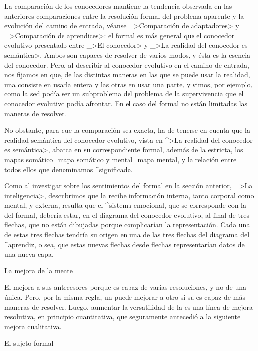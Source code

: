 La comparación de los conocedores mantiene la tendencia observada en las
anteriores comparaciones entre la resolución formal del problema
aparente y la evolución del camino de entrada, véanse _>Comparación de
adaptadores> y _>Comparación de aprendices>: el {\conocedor} formal es
más general que el conocedor evolutivo presentado entre _>El conocedor>
y _>La realidad del conocedor es semántica>. Ambos son capaces de
resolver de varios modos, y ésta es la esencia del conocedor. Pero, al
describir al conocedor evolutivo en el camino de entrada, nos fijamos en
que, de las distintas maneras en las que se puede usar la realidad, una
consiste en usarla entera y las otras en usar una parte, y vimos, por
ejemplo, como la sed podía ser un subproblema del problema de la
supervivencia que el conocedor evolutivo podía afrontar. En el caso del
{\conocedor} formal no están limitadas las maneras de resolver.

No obstante, para que la comparación sea exacta, ha de tenerse en cuenta
que la realidad semántica del conocedor evolutivo, vista en ^>La
realidad del conocedor es semántica>, abarca en su correspondiente
{\conocedor} formal, además de la {\realidad} estricta, los mapas
somático_{mapa somático} y mental_{mapa mental}, y la relación entre
todos ellos que denominamos ^{significado}.

Como al investigar sobre los sentimientos del {\conocedor} formal en la
sección anterior, _>La inteligencia>, descubrimos que la {\inteligencia}
recibe información interna, tanto corporal como mental, y externa,
resulta que el ^{sistema emocional}, que se corresponde con la
{\inteligencia} del {\conocedor} formal, debería estar, en el diagrama
del conocedor evolutivo, al final de tres flechas, que no están
dibujadas porque complicarían la representación. Cada una de estas tres
flechas tendría su origen en una de las tres flechas del diagrama del
^{aprendiz}, o sea, que estas nuevas flechas desde flechas
representarían datos de una nueva capa.


\Section La mejora de la mente

El {\conocedor} mejora a sus antecesores porque es capaz de varias
resoluciones, y no de una única. Pero, por la misma regla, un
{\conocedor} puede mejorar a otro si su {\mente} es capaz de más maneras
de resolver. Luego, aumentar la versatilidad de la {\mente} es una línea
de mejora resolutiva, en principio cuantitativa, que seguramente
antecedió a la siguiente mejora cualitativa.


\Section El sujeto formal

